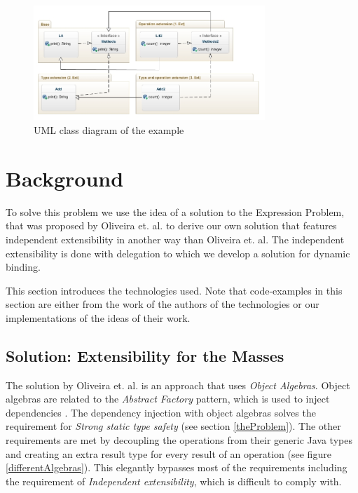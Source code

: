 \documentclass{report}
\begin{document}
\begin{figure}[H]

\includegraphics[width=330px,keepaspectratio=true]{Expression_problem-diag.jpg}

\caption{UML class diagram of the example}
\label{exampleClassDiagram}
\end{figure}

\section{Background}

To solve this problem we use the idea of a solution to the Expression Problem, that was proposed by Oliveira et. al. \cite{Oliv-Extensibility-2012} to derive our own solution that features independent extensibility in another way than Oliveira et. al. The independent extensibility is done with delegation to which we develop a solution for dynamic binding.

This section introduces the technologies used. Note that code-examples in this section are either from the work of the authors of the technologies or our implementations of the ideas of their work.


\subsection{Solution: Extensibility for the Masses}

The solution by Oliveira et. al. \cite{Oliv-Extensibility-2012} is an approach that uses \emph{Object Algebras}. Object algebras are related to the \emph{Abstract Factory} pattern, which is used to inject dependencies \cite{Gof-Design-1993}. The dependency injection with object algebras solves the requirement for \emph{Strong static type safety} (see section \ref{theProblem}). The other requirements are met by decoupling the operations from their generic Java types and creating an extra result type for every result of an operation (see figure \ref{differentAlgebras}). This elegantly bypasses most of the requirements including the requirement of \emph{Independent extensibility}, which is difficult to comply with.
\end{document}
